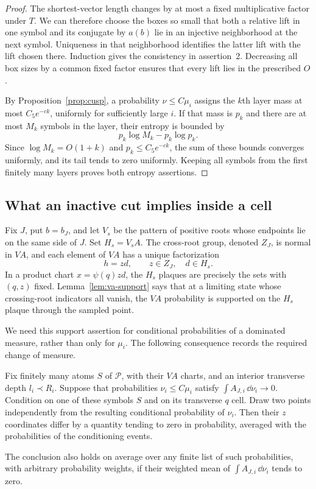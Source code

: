 \begin{proof}
The shortest-vector length changes by at most a fixed multiplicative factor
under $T$.  We can therefore choose the boxes so small that both a relative
lift in one symbol and its conjugate by $a(b)$ lie in an injective
neighborhood at the next symbol.  Uniqueness in that neighborhood identifies
the latter lift with the lift chosen there.  Induction gives the consistency
in assertion~2.  Decreasing all box sizes by a common fixed factor ensures
that every lift lies in the prescribed $O$.

By Proposition~\ref{prop:cusp}, a probability $\nu\leq C\mu_i$ assigns the
$k$th layer mass at most $C_5e^{-c k}$, uniformly for sufficiently large
$i$.  If that mass is $p_k$ and there are at most $M_k$ symbols in the
layer, their entropy is bounded by
\[
 p_k\log M_k-p_k\log p_k.
\]
Since $\log M_k=O(1+k)$ and $p_k\leq C_5e^{-ck}$, the sum of these bounds
converges uniformly, and its tail tends to zero uniformly.  Keeping all
symbols from the first finitely many layers proves both entropy assertions.
\end{proof}

\subsection{What an inactive cut implies inside a cell}

Fix $J$, put $b=b_J$, and let $V_s$ be the pattern of positive roots whose
endpoints lie on the same side of $J$.  Set $H_s=V_sA$.  The cross-root
group, denoted $Z_J$, is normal in $VA$, and each element of $VA$ has a
unique factorization
\[
 h=zd,\qquad z\in Z_J,\quad d\in H_s.
\]
In a product chart $x=\psi(q)zd$, the $H_s$ plaques are precisely the sets
with $(q,z)$ fixed.  Lemma~\ref{lem:va-support} says that at a limiting
state whose crossing-root indicators all vanish, the $VA$ probability
is supported on the $H_s$ plaque through the sampled point.

We need this support assertion for conditional probabilities of a dominated
measure, rather than only for $\mu_i$.  The following consequence records
the required change of measure.

\begin{lemma}\label{lem:inactive-cell-concentration}
Fix finitely many atoms $S$ of $\mathcal P$, with their $VA$ charts, and an
interior transverse depth $l_i\prec R_i$.  Suppose that probabilities
$\nu_i\leq C\mu_i$ satisfy $\int A_{J,i}\,\dd\nu_i\to0$.  Condition on
one of these symbols $S$ and on its transverse $q$ cell.  Draw two points
independently from the resulting conditional probability of $\nu_i$.
Then their $z$ coordinates differ by a quantity tending to zero in
probability, averaged with the probabilities of the conditioning events.

The conclusion also holds on average over any finite list of such
probabilities, with arbitrary probability weights, if their weighted mean
of $\int A_{J,i}\,\dd\nu_i$ tends to zero.
\end{lemma}

